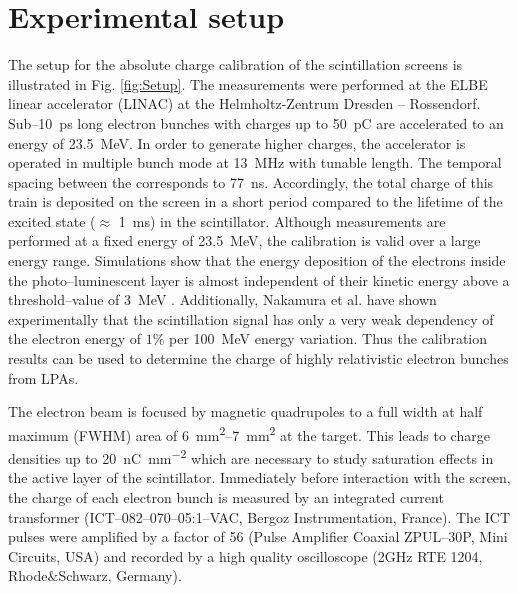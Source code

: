 \documentclass[%
preprint,
amsmath,
amssymb,
aip,
rsi, 
numerical,
floatfix,
]{revtex4-1}
\newcommand{\myCite}[1]{\textcolor{blue}{\cite{#1}}}
\begin{document}
\section{\label{Set} Experimental setup}

The setup for the absolute charge calibration of the scintillation screens is illustrated in Fig. \ref{fig:Setup}.
The measurements were performed at the ELBE linear accelerator (LINAC) at the Helmholtz-Zentrum Dresden -- Rossendorf. 
Sub--\SI{10}{\pico\second} long electron bunches with charges up to \SI{50}{\pico\coulomb} are accelerated to an energy of \SI{23.5}{\mega\electronvolt}. 
In order to generate higher charges, the accelerator is operated in multiple bunch mode at \SI{13}{\mega\hertz} with tunable length. 
The temporal spacing between the corresponds to \SI{77}{\nano\second}. 
Accordingly, the total charge of this train is deposited on the screen in a short period compared to the lifetime of the excited state ($\approx$ \SI{1}{\milli\second}) in the scintillator\myCite{Morlotti1997}.
Although measurements are performed at a fixed energy of \SI{23.5}{\mega\electronvolt}, the calibration is valid over a large energy range.
Simulations show that the energy deposition of the electrons inside the photo--luminescent layer is almost independent of their kinetic energy above a threshold--value of \SI{3}{\mega\electronvolt} \myCite{Hidding2007,Glinec2006,Masuda2008}.
Additionally, Nakamura et al.\myCite{Nakamura2011} have shown experimentally that the scintillation signal has only a very weak dependency of the electron energy of $1\%$ per \SI{100}{\mega \electronvolt} energy variation.
Thus the calibration results can be used to determine the charge of highly relativistic electron bunches from LPAs.

The electron beam is focused by magnetic quadrupoles to a full width at half maximum (FWHM) area of \SIrange{6}{7}{\milli\metre^2} at the target.
This leads to charge densities up to \SI[per-mode=symbol]{20}{\nano\coulomb \per \square\milli\meter} which are necessary to study saturation effects in the active layer of the scintillator.
Immediately before interaction with the screen, the charge of each electron bunch is measured by an integrated current transformer (ICT--082--070--05:1--VAC, Bergoz Instrumentation, France). 
The ICT pulses were amplified by a factor of 56 (Pulse Amplifier Coaxial ZPUL--30P, Mini Circuits, USA) and recorded by a high quality oscilloscope (2GHz RTE 1204, Rhode$\&$Schwarz, Germany).
\end{document}
